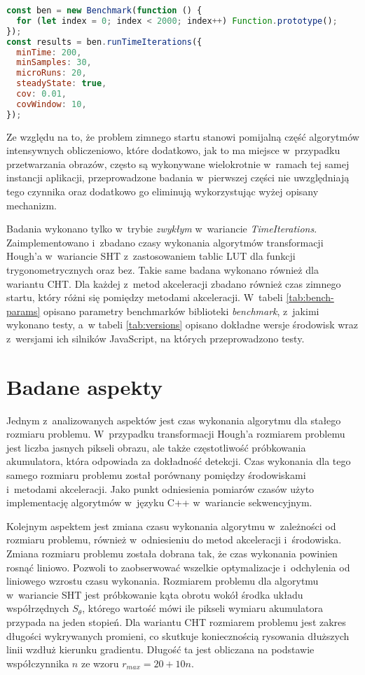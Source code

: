 \begin{lstlisting}[language=JavaScript, label=lst:benchmark-example, caption=Przykładowy benchmark mierzący czas wykonania funkcji \lstinline{Function.prototype()} 2000 razy.]
const ben = new Benchmark(function () {
  for (let index = 0; index < 2000; index++) Function.prototype();
});
const results = ben.runTimeIterations({
  minTime: 200,
  minSamples: 30,
  microRuns: 20,
  steadyState: true,
  cov: 0.01,
  covWindow: 10,
});
\end{lstlisting}


Ze względu na to, że problem zimnego startu stanowi pomijalną część algorytmów intensywnych obliczeniowo, które dodatkowo, jak to ma miejsce w~przypadku przetwarzania obrazów, często są wykonywane wielokrotnie w~ramach tej samej instancji aplikacji, przeprowadzone badania w~pierwszej części nie uwzględniają tego czynnika oraz dodatkowo go eliminują wykorzystując wyżej opisany mechanizm. 




Badania wykonano tylko w~trybie \textit{zwykłym} w~wariancie \textit{TimeIterations}. Zaimplementowano i~zbadano czasy wykonania algorytmów transformacji Hough'a w~wariancie SHT z~zastosowaniem tablic LUT dla funkcji trygonometrycznych oraz bez. Takie same badana wykonano również dla wariantu CHT. Dla każdej z~metod akceleracji zbadano również czas zimnego startu, który różni się pomiędzy metodami akceleracji. W~tabeli \ref{tab:bench-params} opisano parametry benchmarków biblioteki \textit{benchmark}, z~jakimi wykonano testy, a~w tabeli \ref{tab:versions} opisano dokładne wersje środowisk wraz z~wersjami ich silników JavaScript, na których przeprowadzono testy.


\section{Badane aspekty}

Jednym z~analizowanych aspektów jest czas wykonania algorytmu dla stałego rozmiaru problemu. W~przypadku transformacji Hough'a rozmiarem problemu jest liczba jasnych pikseli obrazu, ale także częstotliwość próbkowania akumulatora, która odpowiada za dokładność detekcji. Czas wykonania dla tego samego rozmiaru problemu został porównany pomiędzy środowiskami i~metodami akceleracji. Jako punkt odniesienia pomiarów czasów użyto implementację algorytmów w~języku C++ w~wariancie sekwencyjnym.

Kolejnym aspektem jest zmiana czasu wykonania algorytmu w~zależności od rozmiaru problemu, również w~odniesieniu do metod akceleracji i~środowiska. Zmiana rozmiaru problemu została dobrana tak, że czas wykonania powinien rosnąć liniowo. Pozwoli to zaobserwować wszelkie optymalizacje i~odchylenia od liniowego wzrostu czasu wykonania. Rozmiarem problemu dla algorytmu w~wariancie SHT jest próbkowanie kąta obrotu wokół środka układu współrzędnych $S_\theta$, którego wartość mówi ile pikseli wymiaru akumulatora przypada na jeden stopień. Dla wariantu CHT rozmiarem problemu jest zakres długości wykrywanych promieni, co skutkuje koniecznością rysowania dłuższych linii wzdłuż kierunku gradientu. Długość ta jest obliczana na podstawie współczynnika $n$ ze wzoru $r_{max}=20+10n$.

